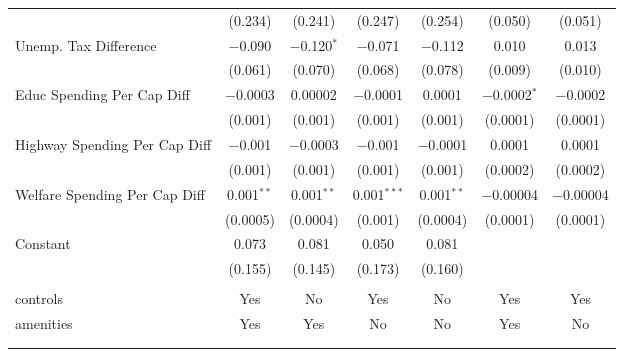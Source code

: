 \begin{table}[!htbp]
\begin{tabular}{@{\extracolsep{5pt}}lcccccc}
  & (0.234) & (0.241) & (0.247) & (0.254) & (0.050) & (0.051) \\ 
  Unemp. Tax Difference & $-$0.090 & $-$0.120$^{*}$ & $-$0.071 & $-$0.112 & 0.010 & 0.013 \\ 
  & (0.061) & (0.070) & (0.068) & (0.078) & (0.009) & (0.010) \\ 
  Educ Spending Per Cap Diff & $-$0.0003 & 0.00002 & $-$0.0001 & 0.0001 & $-$0.0002$^{*}$ & $-$0.0002 \\ 
  & (0.001) & (0.001) & (0.001) & (0.001) & (0.0001) & (0.0001) \\ 
  Highway Spending Per Cap Diff & $-$0.001 & $-$0.0003 & $-$0.001 & $-$0.0001 & 0.0001 & 0.0001 \\ 
  & (0.001) & (0.001) & (0.001) & (0.001) & (0.0002) & (0.0002) \\ 
  Welfare Spending Per Cap Diff & 0.001$^{**}$ & 0.001$^{**}$ & 0.001$^{***}$ & 0.001$^{**}$ & $-$0.00004 & $-$0.00004 \\ 
  & (0.0005) & (0.0004) & (0.001) & (0.0004) & (0.0001) & (0.0001) \\ 
  Constant & 0.073 & 0.081 & 0.050 & 0.081 &  &  \\ 
  & (0.155) & (0.145) & (0.173) & (0.160) &  &  \\ 
 \hline \\[-1.8ex] 
controls & Yes & No & Yes & No & Yes & Yes \\ 
amenities & Yes & Yes & No & No & Yes & No \\ 
\hline \\[-1.8ex] 
\hline 
\hline \\[-1.8ex] 
\end{tabular} 
\end{table} 
